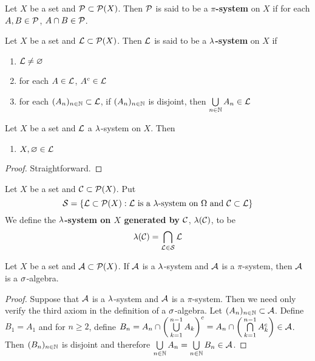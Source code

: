 \documentclass{book}
\begin{document}
	\begin{defn}
		Let $X$ be a set and $\mathcal{P} \subset \mathcal{P}(X)$. Then $\mathcal{P}$ is said to be a \textbf{$\pi$-system} on $X$ if for each $A,B \in \mathcal{P}$, $A \cap B \in \mathcal{P}$.
	\end{defn}
	
	\begin{defn}
		Let $X$ be a set and $\mathcal{L} \subset \mathcal{P}(X)$. Then $\mathcal{L}$ is said to be a \textbf{$\lambda$-system} on $X$ if 
		\begin{enumerate}
			\item $\mathcal{L} \neq \varnothing$
			\item for each $A \in \mathcal{L}$, $A^c \in \mathcal{L}$
			\item for each $(A_n)_{n \in \mathbb{N}} \subset \mathcal{L}$, if $(A_n)_{n \in \mathbb{N}}$ is disjoint, then $\bigcup\limits_{n \in \mathbb{N}}A_n \in \mathcal{L}$
		\end{enumerate}
	\end{defn}
	
	\begin{ex}
		Let $X$ be a set and $\mathcal{L}$ a $\lambda$-system on $X$. Then 
		\begin{enumerate}
			\item $X, \varnothing \in \mathcal{L}$
		\end{enumerate} 
	\end{ex}
	
	\begin{proof}
		Straightforward.
	\end{proof}
	
	\begin{defn}
		Let $X$ be a set and $\mathcal{C} \subset \mathcal{P}(X)$. Put $$\mathcal{S} = \{\mathcal{L} \subset \mathcal{P}(X): \mathcal{L} \text{ is a }\lambda\text{-system on }\Omega \text{ and } \mathcal{C} \subset \mathcal{L}\}$$ We define the \textbf{$\lambda$-system on $X$ generated by $\mathcal{C}$}, $\lambda(\mathcal{C})$, to be $$\lambda(\mathcal{C}) = \bigcap_{\mathcal{L} \in \mathcal{S}}\mathcal{L}$$
	\end{defn}
	
	\begin{ex}
		Let $X$ be a set and $\mathcal{A} \subset \mathcal{P}(X)$. If $\mathcal{A}$ is a $\lambda$-system and $\mathcal{A}$ is a $\pi$-system, then $\mathcal{A}$ is a $\sigma$-algebra.
	\end{ex}
	
	\begin{proof}
		Suppose that $\mathcal{A}$ is a $\lambda$-system and $\mathcal{A}$ is a $\pi$-system. Then we need only verify the third axiom in the definition of a $\sigma$-algebra. Let $(A_n)_{n \in \mathbb{N}} \subset \mathcal{A}$. Define $B_1 = A_1$ and for $n \geq 2$, define $B_n = A_n \cap \bigg( \bigcup\limits_{k=1}^{n-1}A_k \bigg)^c = A_n \cap \bigg( \bigcap\limits_{k=1}^{n-1}A_k^c \bigg) \in \mathcal{A}$. Then $(B_n)_{n \in \mathbb{N}}$ is disjoint and therefore $\bigcup\limits_{n \in \mathbb{N}}A_n = \bigcup\limits_{n \in \mathbb{N}}B_n \in \mathcal{A}$.
	\end{proof}
	
\end{document}
